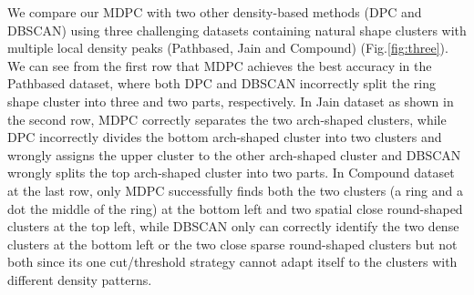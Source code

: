 \documentclass{llncs}
\begin{document}
We compare our MDPC with two other density-based methods (DPC and DBSCAN) using three challenging datasets containing natural shape clusters with multiple local density peaks (Pathbased, Jain and Compound) (Fig.\ref{fig:three}). We can see from the first row that MDPC achieves the best accuracy in the Pathbased dataset, where both DPC and DBSCAN incorrectly split the ring shape cluster into three and two parts, respectively. In Jain dataset as shown in the second row, MDPC correctly separates the two arch-shaped clusters, while DPC incorrectly divides the bottom arch-shaped cluster into two clusters and wrongly assigns the upper cluster to the other arch-shaped cluster and DBSCAN wrongly splits the top arch-shaped cluster into two parts. In Compound dataset at the last row, only MDPC successfully finds both the two clusters (a ring and a dot the middle of the ring) at the bottom left and two spatial close round-shaped clusters at the top left, while DBSCAN only can correctly identify the two dense clusters at the bottom left or the two close sparse round-shaped clusters but not both since its one cut/threshold strategy cannot adapt itself to the clusters with different density patterns. 
\end{document}
